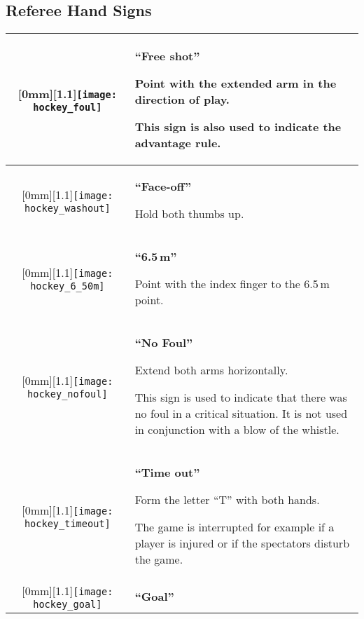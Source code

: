 \subsection{Referee Hand Signs}
\renewcommand{\arraystretch}{1.5}
\begin{longtable}{|c|p{10.8cm}|}

\hline %

\raisebox{-\height}[0mm][1.1\height]{\texttt{[image: hockey\_foul]}}
&
\textbf{``Free shot''}

Point with the extended arm in the direction of play.

This sign is also used to indicate the advantage rule.\\

\hline %

\raisebox{-\height}[0mm][1.1\height]{\texttt{[image: hockey\_washout]}}
&
\textbf{``Face-off''}

Hold both thumbs up.\\

\hline %

\raisebox{-\height}[0mm][1.1\height]{\texttt{[image: hockey\_6\_50m]}}
&
\textbf{``6.5\,m''}

Point with the index finger to the 6.5\,m point.\\ 

\hline %

\raisebox{-\height}[0mm][1.1\height]{\texttt{[image: hockey\_nofoul]}}
&
\textbf{``No Foul''}

Extend both arms horizontally.

This sign is used to indicate that there was no foul in a critical situation.
It is not used in conjunction with a blow of the whistle.\\ 

\hline %

\raisebox{-\height}[0mm][1.1\height]{\texttt{[image: hockey\_timeout]}}
&
\textbf{``Time out''}

Form the letter ``T'' with both hands.

The game is interrupted for example if a player is injured or if the spectators disturb the game.\\ 

\hline %

\raisebox{-\height}[0mm][1.1\height]{\texttt{[image: hockey\_goal]}}
&
\textbf{``Goal''}


\end{longtable}

